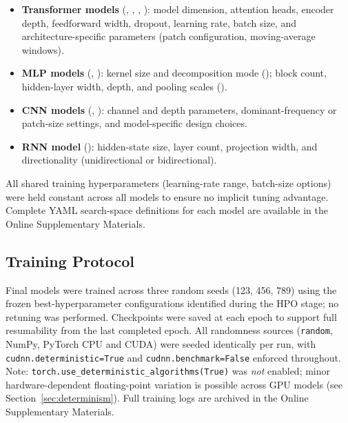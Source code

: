 \begin{itemize}[nosep]
  \item \textbf{Transformer models} (\autoformer, \patchtst, \itransformer, \timexer): model dimension,
        attention heads, encoder depth, feedforward width, dropout, learning rate, batch size, and
        architecture-specific parameters (patch configuration, moving-average windows).
  \item \textbf{MLP models} (\dlinear, \nhits): kernel size and decomposition mode (\dlinear); block
        count, hidden-layer width, depth, and pooling scales (\nhits).
  \item \textbf{CNN models} (\timesnet, \moderntcn): channel and depth parameters, dominant-frequency
        or patch-size settings, and model-specific design choices.
  \item \textbf{RNN model} (\lstm): hidden-state size, layer count, projection width, and
        directionality (unidirectional or bidirectional).
\end{itemize}

All shared training hyperparameters (learning-rate range, batch-size options) were held constant
across all models to ensure no implicit tuning advantage.  Complete YAML search-space definitions
for each model are available in the Online Supplementary Materials.

\subsection{Training Protocol}
\label{sec:app_training}

Final models were trained across three random seeds (123, 456, 789) using the frozen
best-hyperparameter configurations identified during the HPO stage; no retuning was performed.
Checkpoints were saved at each epoch to support full resumability from the last completed epoch.
All randomness sources (\texttt{random}, NumPy, PyTorch CPU and CUDA) were seeded identically per
run, with \texttt{cudnn.deterministic=True} and \texttt{cudnn.benchmark=False} enforced throughout.
Note: \texttt{torch.use\_deterministic\_algorithms(True)} was \emph{not} enabled; minor
hardware-dependent floating-point variation is possible across GPU models (see
Section~\ref{sec:determinism}).  Full training logs are archived in the Online
Supplementary Materials.

